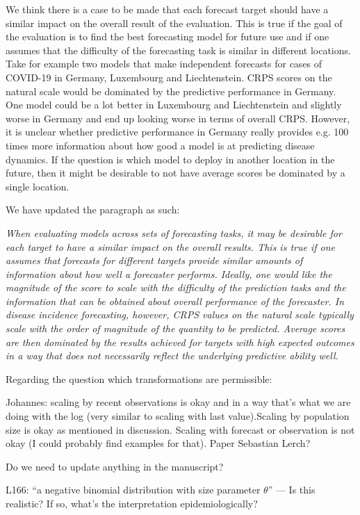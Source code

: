 \documentclass{article}
\newcommand{\red}{\color{red}}
\newcommand{\black}{\color{black}}
\begin{document}
\black
We think there is a case to be made that each forecast target should have a similar impact on the overall result of the evaluation. This is true if the goal of the evaluation is to find the best forecasting model for future use and if one assumes that the difficulty of the forecasting task is similar in different locations. Take for example two models that make independent forecasts for cases of COVID-19 in Germany, Luxembourg and Liechtenstein. CRPS scores on the natural scale would be dominated by the predictive performance in Germany. One model could be a lot better in Luxembourg and Liechtenstein and slightly worse in Germany and end up looking worse in terms of overall CRPS. However, it is unclear whether predictive performance in Germany really provides e.g. 100 times more information about how good a model is at predicting disease dynamics. If the question is which model to deploy in another location in the future, then it might be desirable to not have average scores be dominated by a single location. 

We have updated the paragraph as such: 

\textit{When evaluating models across sets of forecasting tasks, it may be desirable for each target to have a similar impact on the overall results. This is true if one assumes that forecasts for different targets provide similar amounts of information about how well a forecaster performs. Ideally, one would like the magnitude of the score to scale with the difficulty of the prediction tasks and the information that can be obtained about overall performance of the forecaster. In disease incidence forecasting, however, CRPS values on the natural scale typically scale with the order of magnitude of the quantity to be predicted. Average scores are then dominated by the results achieved for targets with high expected outcomes in a way that does not necessarily reflect the underlying predictive ability well.}

Regarding the question which transformations are permissible: 

Johannes: scaling by recent observations is okay and in a way that's what we are doing with the log (very similar to scaling with last value).Scaling by population size is okay as mentioned in discussion. Scaling with forecast or observation is not okay (I could probably find examples for that).
Paper Sebastian Lerch? 


Do we need to update anything in the manuscript? 

\red
L166: “a negative binomial distribution with size parameter $\theta$” — Is this realistic? If so, what’s the interpretation epidemiologically?
\end{document}
